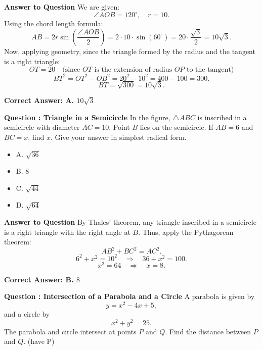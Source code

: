 \documentclass{beamer}
\begin{document}
\begin{frame}{\textbf{Answer to Question }}
We are given:
\[
\angle AOB = 120^\circ, \quad r = 10.
\]
Using the chord length formula:
\[
AB = 2r \sin \left(\frac{\angle AOB}{2}\right) = 2 \cdot 10 \cdot \sin(60^\circ) = 20 \cdot \frac{\sqrt{3}}{2} = 10\sqrt{3}.
\]
Now, applying geometry, since the triangle formed by the radius and the tangent is a right triangle:
\[
OT = 20 \quad \text{(since } OT \text{ is the extension of radius } OP \text{ to the tangent)}
\]
\[
BT^2 = OT^2 - OB^2 = 20^2 - 10^2 = 400 - 100 = 300.
\]
\[
BT = \sqrt{300} = 10\sqrt{3}.
\]

\textbf{Correct Answer: A. \(10\sqrt{3}\)}
\end{frame}





\begin{frame}{\textbf{Question : Triangle in a Semicircle}}
In the figure, \(\triangle ABC\) is inscribed in a semicircle with diameter \(AC = 10\). Point \(B\) lies on the semicircle. If \(AB = 6\) and \(BC = x\), find \(x\). Give your answer in simplest radical form.

\begin{itemize}
    \item A. \(\sqrt{36}\)
    \item B. \(8\)
    \item C. \(\sqrt{44}\)
    \item D. \(\sqrt{64}\)
\end{itemize}
\end{frame}


\begin{frame}{\textbf{Answer to Question }}
By Thales' theorem, any triangle inscribed in a semicircle is a right triangle with the right angle at \(B\). Thus, apply the Pythagorean theorem:
\[
AB^2 + BC^2 = AC^2.
\]
\[
6^2 + x^2 = 10^2 \quad \Rightarrow \quad 36 + x^2 = 100.
\]
\[
x^2 = 64 \quad \Rightarrow \quad x = 8.
\]

\textbf{Correct Answer: B. \(8\)}
\end{frame}



\begin{frame}{\textbf{Question : Intersection of a Parabola and a Circle}}
A parabola is given by 
\[
y = x^2 - 4x + 5,
\]
and a circle by 
\[
x^2 + y^2 = 25.
\]
The parabola and circle intersect at points \(P\) and \(Q\). Find the distance between \(P\) and \(Q\).
(have P)


\end{frame}
\end{document}
